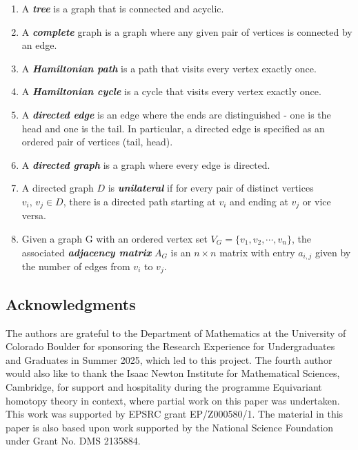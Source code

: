 \documentclass{amsart}
\theoremstyle{definition}
\theoremstyle{plain}
\numberwithin{theorem}{section}
\numberwithin{equation}{section}
\numberwithin{figure}{section}
\newcommand{\0}{\langle 0 \rangle }
\begin{document}
\begin{enumerate}
    \item A \textbf{\textit{tree}} is a graph that is connected and acyclic. 

    \item A \textbf{\textit{complete}} graph is a graph where any given pair of vertices is connected by an edge. 

    \item A \textbf{\textit{Hamiltonian path}} is a path that visits every vertex exactly once. 

    \item A \textbf{\textit{Hamiltonian cycle}} is a cycle that visits every vertex exactly once. 

    \item A \textbf{\textit{directed edge}} is an edge where the ends are distinguished - one is the head and one is the tail. In particular, a directed edge is specified as an ordered pair of vertices (tail, head).

    \item A \textbf{\textit{directed graph}} is a graph where every edge is directed. 

    \item A directed graph $D$ is \textbf{\textit{unilateral}} if for every pair of distinct vertices $v_i, \, v_j \in D$, there is a directed path starting at $v_i$ and ending at $v_j$ or vice versa. 

    \item Given a graph G with an ordered vertex set $V_G = \{v_1, v_2, \cdots, v_n \}$, the associated \textbf{\textit{adjacency matrix}} $A_G$ is an $n \times n$ matrix with entry $a_{i,j}$ given by the number of edges from $v_i$ to $v_j$.
\end{enumerate}

\subsection*{Acknowledgments}
The authors are grateful to the Department of Mathematics at the University of Colorado Boulder for sponsoring the Research Experience for Undergraduates and Graduates in Summer 2025, which led to this project. The fourth author would also like to thank the Isaac Newton Institute for Mathematical Sciences, Cambridge, for support and hospitality during the programme Equivariant homotopy theory in context, where partial work on this paper was undertaken. This work was supported by EPSRC grant EP/Z000580/1. The material in this paper is also based upon work supported by the National Science Foundation under Grant No. DMS 2135884.
\end{document}

